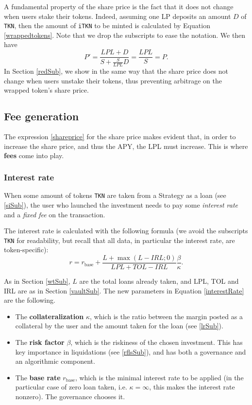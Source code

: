 \documentclass[a4paper,10 pt]{article}
\theoremstyle{definition}
\begin{document}
A fundamental property of the share price is the fact that it does not change when users stake their tokens. Indeed, assuming one LP deposits an amount $D$ of \verb|TKN|, then the amount of \verb|iTKN| to be minted is calculated by Equation \eqref{wrappedtokens}. Note that we drop the subscripts to ease the notation. We then have
$$P' = \frac{LPL + D}{S + \frac{S}{LPL}D} = \frac{LPL}{S} = P.$$
In Section \ref{redSub}, we show in the same way that the share price does not change when users unstake their tokens, thus preventing arbitrage on the wrapped token's share price.

\subsection{Fee generation}\label{fgSub}
The expression \eqref{shareprice} for the share price makes evident that, in order to increase the share price, and thus the APY, the LPL must increase. This is where {\bf fees} come into play.

\subsubsection{Interest rate}\label{irSubSub}
When some amount of tokens \verb|TKN| are taken from a Strategy as a loan (see \ref{siSub}), the user who launched the investment needs to pay some {\it interest rate} and a {\it fixed fee} on the transaction. 

The interest rate is calculated with the following formula (we avoid the subscripts \verb|TKN| for readability, but recall that all data, in particular the interest rate, are token-specific):
\begin{equation}\label{interestRate}
r = r_{\text{base}} + \frac{L + \max(L-IRL;0)}{LPL+TOL-IRL}\frac{\beta}{\kappa}.
\end{equation}

As in Section \ref{wtSub}, $L$ are the total loans already taken, and LPL, TOL and IRL are as in Section \ref{vaultSub}. The new parameters in Equation \eqref{interestRate} are the following.
\begin{itemize}
\item The {\bf collateralization} $\kappa$, which is the ratio between the margin posted as a collateral by the user and the amount taken for the loan (see \ref{lrSub}).
\item The {\bf risk factor} $\beta$, which is the riskiness of the chosen investment. This has key importance in liquidations (see \ref{rflsSub}), and has both a governance and an algorithmic component.
\item The {\bf base rate} $r_\text{base}$, which is the minimal interest rate to be applied (in the particular case of zero loan taken, i.e. $\kappa = \infty$, this makes the interest rate nonzero). The governance chooses it.
\end{itemize}
\end{document}
